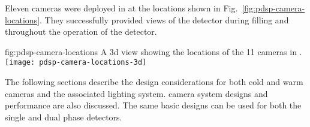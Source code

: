 Eleven cameras were deployed in  at the locations shown in Fig.~\ref{fig:pdsp-camera-locations}. They successfully provided views of the detector during filling and throughout the operation of the detector.

\begin{dunefigure}{fig:pdsp-camera-locations}
  {A 3d view showing the locations of the 11 cameras in .}
  \texttt{[image: pdsp-camera-locations-3d]}%
\end{dunefigure}

The following sections describe the design considerations for both cold
and warm cameras and the associated lighting system.  camera system designs and performance are also discussed.  
The same basic
designs can be used for both the single and dual phase detectors.

